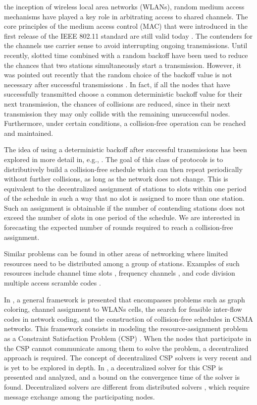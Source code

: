 \documentclass[journal]{IEEEtran}
\begin{document}
 the inception of wireless local area networks (WLANs), random medium access mechanisms have played a key role in arbitrating access to shared channels. The core principles of the medium access control (MAC) that were introduced in the first release of the IEEE 802.11 standard are still valid today \cite{IEEE80211-IEEESTD2007}. The contenders for the channels use carrier sense to avoid interrupting ongoing transmissions. Until recently, slotted time combined with a random backoff have been used to reduce the chances that two stations simultaneously start a transmission. However, it was pointed out recently that the random choice of the backoff value is not necessary after successful transmissions \cite{barcelo2008lba}.
In fact, if all the nodes that have successfully transmitted choose a common deterministic backoff value for their next transmission, the chances of collisions are reduced, since in their next transmission they may only collide with the remaining unsuccessful nodes. Furthermore, under certain conditions, a collision-free operation can be reached and maintained.

The idea of using a deterministic backoff after successful transmissions has been explored in more detail in, e.g., \cite{he2009srb,barcelo2011tcf,fang2011dlm,barcelo2010fcc}.
The goal of this class of protocols is to distributively build a collision-free schedule which can then repeat periodically without further collisions, as long as the network does not change. This is equivalent to the decentralized assignment of stations to slots within one period of the schedule in such a way that no slot is assigned to more than one station. Such an assignment is obtainable if the number of contending stations does not exceed the number of slots in one period of the schedule. We are interested in forecasting the expected number of rounds required to reach a collision-free assignment.


Similar problems can be found in other areas of networking where limited resources need to be distributed among a group of stations. Examples of such resources include channel time slots \cite{barcelo2008lba}, frequency channels \cite{duffy2011dcs}, and code division multiple access scramble codes \cite{checco2012scs}.

In \cite{duffy2011dcs}, a general framework is presented that encompasses problems such as graph coloring, channel assignment to WLANs cells, the search for feasible inter-flow codes in network coding, and the construction of collision-free schedules in CSMA networks.
This framework consists in modeling the resource-assignment problem as a Constraint Satisfaction Problem (CSP) \cite{tsang1993fcs}.
When the nodes that participate in the CSP cannot communicate among them to solve the problem, a decentralized approach is required.
The concept of decentralized CSP solvers is very recent and is yet to be explored in depth.
In \cite{duffy2011dcs}, a decentralized solver for this CSP is presented and analyzed, and a bound on the convergence time of the solver is found.
Decentralized solvers are different from distributed solvers \cite{yokoo2000adc}, which require message exchange among the participating nodes.
\end{document}
